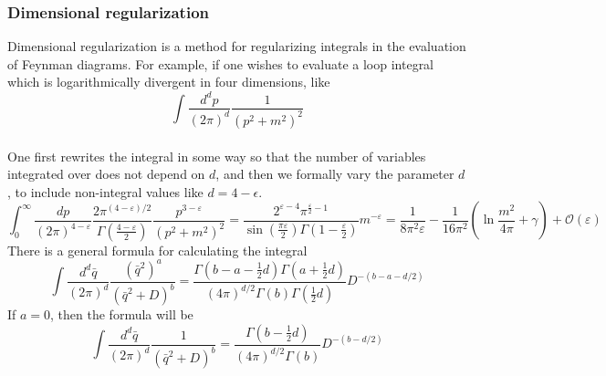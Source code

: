 \subsubsection{Dimensional regularization}
Dimensional regularization is a method for regularizing integrals in the evaluation of Feynman diagrams. For example, if one wishes to evaluate a loop integral which is logarithmically divergent in four dimensions, like
\[\int {\frac {d^{d}p}{(2\pi )^{d}}}{\frac {1}{\left(p^{2}+m^{2}\right)^{2}}}\]
\\
One first rewrites the integral in some way so that the number of variables integrated over does not depend on $d$, and then we formally vary the parameter $d$, to include non-integral values like $d=4-\epsilon$.
\[\int _{0}^{\infty }{\frac {dp}{(2\pi )^{4-\varepsilon }}}{\frac {2\pi ^{(4-\varepsilon )/2}}{\Gamma \left({\frac {4-\varepsilon }{2}}\right)}}{\frac {p^{3-\varepsilon }}{\left(p^{2}+m^{2}\right)^{2}}}={\frac {2^{\varepsilon -4}\pi ^{{\frac {\varepsilon }{2}}-1}}{\sin({\frac {\pi \varepsilon }{2}})\Gamma (1-{\frac {\varepsilon }{2}})}}m^{-\varepsilon }={\frac {1}{8\pi ^{2}\varepsilon }}-{\frac {1}{16\pi ^{2}}}\left(\ln {\frac {m^{2}}{4\pi }}+\gamma \right)+{\mathcal {O}}(\varepsilon )\]
There is a general formula for calculating the integral
\[\int \frac{d^d \bar{q}}{(2\pi)^{d}} \frac{(\bar{q}^2)^a}{(\bar{q}^2+D)^b} = \frac{\Gamma(b-a-\frac{1}{2}d) \Gamma(a+\frac{1}{2}d)}{(4\pi)^{d/2} \Gamma(b) \Gamma(\frac{1}{2}d)} D^{-(b-a-d/2)}\]
If $a=0$, then the formula will be
\[\int \frac{d^d \bar{q}}{(2\pi)^{d}} \frac{1}{(\bar{q}^2+D)^b} = \frac{\Gamma(b-\frac{1}{2}d)}{(4\pi)^{d/2} \Gamma(b)} D^{-(b-d/2)}\]

